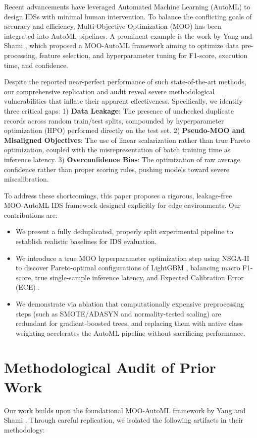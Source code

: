 \documentclass[journal, twocolumn]{IEEEtran}
\begin{document}
Recent advancements have leveraged Automated Machine Learning (AutoML) to design IDSs with minimal human intervention. To balance the conflicting goals of accuracy and efficiency, Multi-Objective Optimization (MOO) has been integrated into AutoML pipelines. A prominent example is the work by Yang and Shami \cite{yang2025towards, yang2024towards}, which proposed a MOO-AutoML framework aiming to optimize data pre-processing, feature selection, and hyperparameter tuning for F1-score, execution time, and confidence.

Despite the reported near-perfect performance of such state-of-the-art methods, our comprehensive replication and audit reveal severe methodological vulnerabilities that inflate their apparent effectiveness. Specifically, we identify three critical gaps: 
1) \textbf{Data Leakage}: The presence of unchecked duplicate records across random train/test splits, compounded by hyperparameter optimization (HPO) performed directly on the test set.
2) \textbf{Pseudo-MOO and Misaligned Objectives}: The use of linear scalarization rather than true Pareto optimization, coupled with the misrepresentation of batch training time as inference latency. 
3) \textbf{Overconfidence Bias}: The optimization of raw average confidence rather than proper scoring rules, pushing models toward severe miscalibration.

To address these shortcomings, this paper proposes a rigorous, leakage-free MOO-AutoML IDS framework designed explicitly for edge environments. Our contributions are:
\begin{itemize}
    \item We present a fully deduplicated, properly split experimental pipeline to establish realistic baselines for IDS evaluation.
    \item We introduce a true MOO hyperparameter optimization step using NSGA-II to discover Pareto-optimal configurations of LightGBM \cite{ke2017lightgbm}, balancing macro F1-score, true single-sample inference latency, and Expected Calibration Error (ECE) \cite{guo2017calibration}.
    \item We demonstrate via ablation that computationally expensive preprocessing steps (such as SMOTE/ADASYN and normality-tested scaling) are redundant for gradient-boosted trees, and replacing them with native class weighting accelerates the AutoML pipeline without sacrificing performance.
\end{itemize}

\section{Methodological Audit of Prior Work}
Our work builds upon the foundational MOO-AutoML framework by Yang and Shami \cite{yang2025towards}. Through careful replication, we isolated the following artifacts in their methodology:
\end{document}
